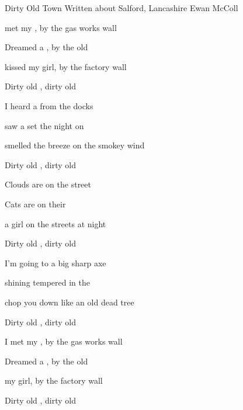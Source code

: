 \begin{SBSong}{Dirty Old Town}
  {Written about Salford, Lancashire}
  {Ewan McColl}
  \begin{SBVerse}
     met my , by the gas works wall

    Dreamed a , by the old 

     kissed my girl, by the factory wall

    Dirty old , dirty old  
  \end{SBVerse}
  \begin{SBVerse}
    I heard a  from the docks

    saw a  set the night on 

     smelled the breeze on the smokey wind

    Dirty old , dirty old  
  \end{SBVerse}
  \begin{SBVerse}
    Clouds are  on the street

    Cats are  on their 

     a girl on the streets at night

    Dirty old , dirty old  
  \end{SBVerse}
  \begin{SBVerse}
    I'm going to  a big sharp axe

    shining  tempered in the 

     chop you down like an old dead tree

    Dirty old , dirty old  
  \end{SBVerse}
  \begin{SBVerse}
    I met my , by the gas works wall

    Dreamed a , by the old 

     my girl, by the factory wall

    Dirty old , dirty old 
  \end{SBVerse}
\end{SBSong}

